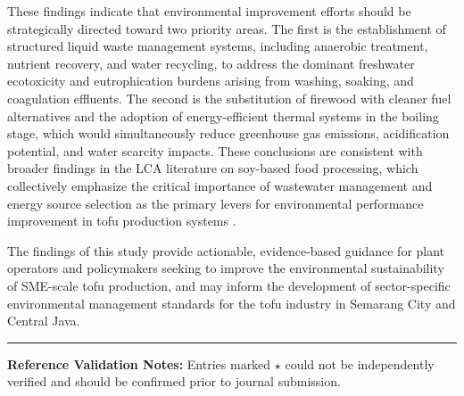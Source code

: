 \documentclass[12pt,a4paper]{article}
\begin{document}
These findings indicate that environmental improvement efforts should be strategically directed toward
two priority areas. The first is the establishment of structured liquid waste management systems,
including anaerobic treatment, nutrient recovery, and water recycling, to address the dominant
freshwater ecotoxicity and eutrophication burdens arising from washing, soaking, and coagulation
effluents. The second is the substitution of firewood with cleaner fuel alternatives and the adoption
of energy-efficient thermal systems in the boiling stage, which would simultaneously reduce greenhouse
gas emissions, acidification potential, and water scarcity impacts. These conclusions are consistent
with broader findings in the LCA literature on soy-based food processing, which collectively emphasize
the critical importance of wastewater management and energy source selection as the primary levers for
environmental performance improvement in tofu production systems \citep{Nugroho2024, Wardana2024}.

The findings of this study provide actionable, evidence-based guidance for plant operators and
policymakers seeking to improve the environmental sustainability of SME-scale tofu production, and may
inform the development of sector-specific environmental management standards for the tofu industry in
Semarang City and Central Java.



\noindent\textcolor{ruleblue}{\rule{\linewidth}{0.6pt}}

\begin{small}
\noindent\textbf{Reference Validation Notes:} Entries marked \textcolor{warnamber}{$\star$} could not
be independently verified and should be confirmed prior to journal submission.
\end{small}

\vspace{4pt}
\end{document}
